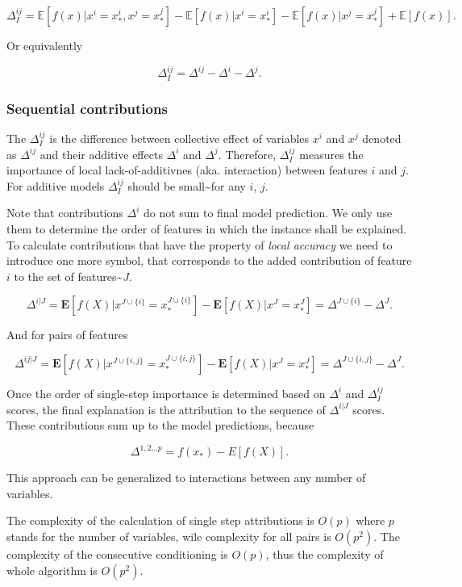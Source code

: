 \documentclass[12pt,]{krantz}
\theoremstyle{definition}
\theoremstyle{definition}
\theoremstyle{definition}
\theoremstyle{remark}
\begin{document}
\[
\Delta_{I}^{ij} =  \mathbb{E}[f(x)|x^i = x_*^i, x^j = x_*^j] -  \mathbb{E}[f(x)|x^i = x_*^i] -  \mathbb{E}[f(x)|x^j = x_*^j] + \mathbb{E}[f(x)].
\]

Or equivalently

\[
\Delta_{I}^{ij} = \Delta^{ij} - \Delta^i - \Delta^j. 
\]

\hypertarget{sequential-contributions}{%
\subsubsection{Sequential
contributions}\label{sequential-contributions}}

The \(\Delta_{I}^{ij}\) is the difference between collective effect of
variables \(x^i\) and \(x^j\) denoted as \(\Delta^{ij}\) and their
additive effects \(\Delta^{i}\) and \(\Delta^{j}\). Therefore,
\(\Delta_{I}^{ij}\) measures the importance of local lack-of-additivnes
(aka. interaction) between features \(i\) and \(j\). For additive models
\(\Delta_{I}^{ij}\) should be small\textasciitilde{}for any \(i\),
\(j\).

Note that contributions \(\Delta^{i}\) do not sum to final model
prediction. We only use them to determine the order of features in which
the instance shall be explained. To calculate contributions that have
the property of \emph{local accuracy} we need to introduce one more
symbol, that corresponds to the added contribution of feature \(i\) to
the set of features\textasciitilde{}\(J\).

\[
\Delta^{i|J} = \mathbf{E}[f(X)| x^{J\cup\{i\}} = x^{J\cup\{i\}}_{*}] -  \mathbf{E}[f(X)| x^{J} = x^{J}_{*}] =     \Delta^{J\cup\{i\}} - \Delta^{J}.
\]

And for pairs of features

\[
\Delta^{ij|J} = \mathbf{E}[f(X)| x^{J\cup\{i,j\}} = x^{J\cup\{i,j\}}_{*}] -  \mathbf{E}[f(X)| x^{J} = x^{J}_{*}] = 
    \Delta^{J\cup\{i,j\}} - \Delta^{J}.
\]

Once the order of single-step importance is determined based on
\(\Delta^i\) and \(\Delta_{I}^{ij}\) scores, the final explanation is
the attribution to the sequence of \(\Delta^{i|J}\) scores. These
contributions sum up to the model predictions, because

\[
\Delta^{1,2...p} = f(x_*) - E[f(X)].
\]

This approach can be generalized to interactions between any number of
variables.

The complexity of the calculation of single step attributions is
\(O(p)\) where \(p\) stands for the number of variables, wile complexity
for all pairs is \(O(p^2)\). The complexity of the consecutive
conditioning is \(O(p)\), thus the complexity of whole algorithm is
\(O(p^2)\).
\end{document}
